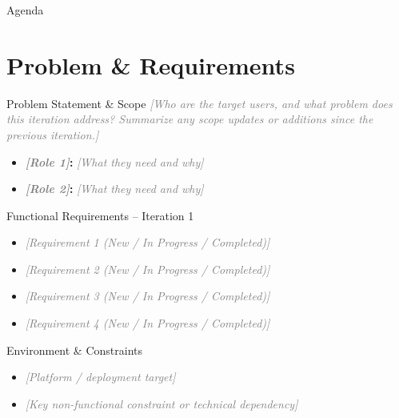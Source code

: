 \documentclass[11pt,aspectratio=169]{beamer}
\title{\fillin{Project Name}}
\subtitle{Iteration \iterationNumber{} Deliverable}
\author{\fillin{Team Number} \texorpdfstring{\\}{ } \fillin{Member A} \and \fillin{Member B} \and \fillin{Member C} \and \fillin{Member D} \and \fillin{Member E}}
\date{\fillin{Date}}
\newcommand{\iterationNumber}{1} %
\newcommand{\fillin}[1]{\textcolor{gray}{\itshape [#1]}}
\begin{document}
\maketitle

\begin{frame}{Agenda}
\tableofcontents
\end{frame}

\section{Problem \& Requirements}

\begin{frame}{Problem Statement \& Scope}
\fillin{Who are the target users, and what problem does this iteration address? Summarize any scope updates or additions since the previous iteration.}
\begin{itemize}
  \item \textbf{\fillin{Role 1}:} \fillin{What they need and why}
  \item \textbf{\fillin{Role 2}:} \fillin{What they need and why}
\end{itemize}
\end{frame}

\begin{frame}{Functional Requirements -- Iteration \iterationNumber}
\begin{itemize}
  \item \fillin{Requirement 1 (New / In Progress / Completed)}
  \item \fillin{Requirement 2 (New / In Progress / Completed)}
  \item \fillin{Requirement 3 (New / In Progress / Completed)}
  \item \fillin{Requirement 4 (New / In Progress / Completed)}
\end{itemize}
\end{frame}

\begin{frame}{Environment \& Constraints}
\begin{itemize}
  \item \fillin{Platform / deployment target}
  \item \fillin{Key non-functional constraint or technical dependency}
\end{itemize}
\end{frame}
\end{document}
